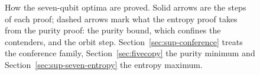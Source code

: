 \begin{figure}[tbp]
\caption{How the seven-qubit optima are proved. Solid arrows are the steps of each proof; dashed arrows mark what the
entropy proof takes from the purity proof: the purity bound, which confines the contenders, and the orbit step. Section~\ref{sec:sup-conference} treats the conference family,
Section~\ref{sec:fivecopy} the purity minimum and Section~\ref{sec:sup-seven-entropy} the entropy maximum.}
\label{fig:seven-proof-map}
\end{figure}
